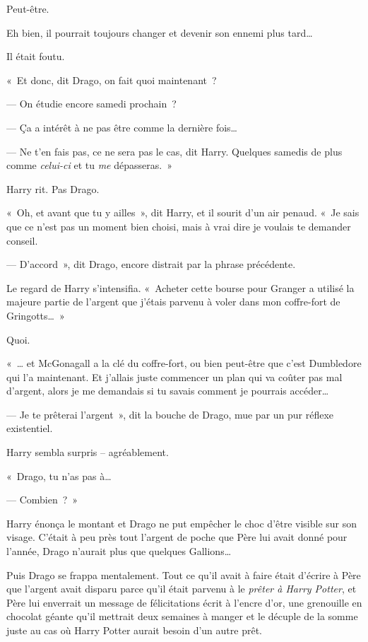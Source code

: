 Peut-être.

Eh bien, il pourrait toujours changer et devenir son ennemi plus tard…

Il était foutu.

«~Et donc, dit Drago, on fait quoi maintenant~?

--- On étudie encore samedi prochain~?

--- Ça a intérêt à ne pas être comme la dernière fois…

--- Ne t'en fais pas, ce ne sera pas le cas, dit Harry.
Quelques samedis de plus comme \emph{celui-ci} et tu \emph{me} dépasseras.~»

Harry rit.
Pas Drago.

«~Oh, et avant que tu y ailles~», dit Harry, et il sourit d'un air penaud.
«~Je sais que ce n'est pas un moment bien choisi, mais à vrai dire je voulais te demander conseil.

--- D'accord~», dit Drago, encore distrait par la phrase précédente.

Le regard de Harry s'intensifia.
«~Acheter cette bourse pour Granger a utilisé la majeure partie de l'argent que j'étais parvenu à voler dans mon coffre-fort de Gringotts…~»

Quoi.

«~… et McGonagall a la clé du coffre-fort, ou bien peut-être que c'est Dumbledore qui l'a maintenant.
Et j'allais juste commencer un plan qui va coûter pas mal d'argent, alors je me demandais si tu savais comment je pourrais accéder…

--- Je te prêterai l'argent~», dit la bouche de Drago, mue par un pur réflexe existentiel.

Harry sembla surpris -- agréablement.

«~Drago, tu n'as pas à…

--- Combien~?~»

Harry énonça le montant et Drago ne put empêcher le choc d'être visible sur son visage.
C'était à peu près tout l'argent de poche que Père lui avait donné pour l'année, Drago n'aurait plus que quelques Gallions…

Puis Drago se frappa mentalement.
Tout ce qu'il avait à faire était d'écrire à Père que l'argent avait disparu parce qu'il était parvenu à le \emph{prêter à Harry Potter}, et Père lui enverrait un message de félicitations écrit à l'encre d'or, une grenouille en chocolat géante qu'il mettrait deux semaines à manger et le décuple de la somme juste au cas où Harry Potter aurait besoin d'un autre prêt.

